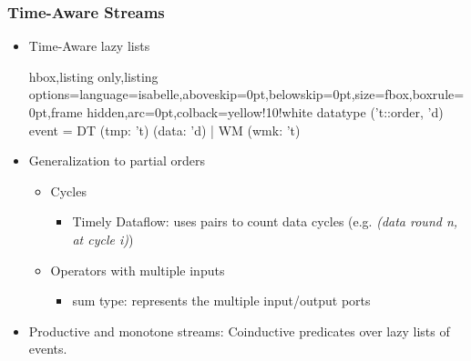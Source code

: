 \documentclass[aspectratio=169,10pt]{beamer}
\begin{document}
\begin{frame}[fragile]
  \frametitle{Time-Aware Streams}
  \begin{itemize}
    \item Time-Aware lazy lists
          \vspace*{-1ex}
          \begin{tcblisting}{hbox,listing only,listing options={language=isabelle,aboveskip=0pt,belowskip=0pt},size=fbox,boxrule=0pt,frame hidden,arc=0pt,colback=yellow!10!white}
datatype ('t::order, 'd) event = DT (tmp: 't) (data: 'd) | WM (wmk: 't)
          \end{tcblisting}
          \vspace*{-1ex}
          \pause
    \item Generalization to partial orders
          \begin{itemize}
            \item Cycles
                  \begin{itemize}
                    \item Timely Dataflow: uses pairs to count data cycles (e.g. \textit{(data round n, at cycle i)})
                  \end{itemize}
            \item Operators with multiple inputs
                  \begin{itemize}
                    \item sum type: represents the multiple input/output ports
                  \end{itemize}
          \end{itemize}
    \item Productive and monotone streams: Coinductive predicates over lazy lists of events.
  \end{itemize}
\end{frame}
\end{document}
